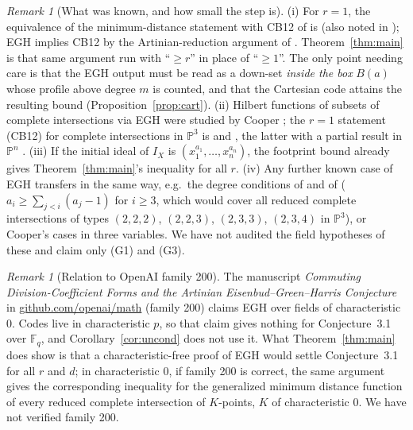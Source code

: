 \documentclass[11pt]{amsart}
\theoremstyle{remark}
\newtheorem{remark}[theorem]{Remark}
\theoremstyle{definition}
\newcommand{\F}{\mathbb F}
\begin{document}
\begin{remark}[What was known, and how small the step is]\label{rem:known}
(i) For $r=1$, the equivalence of the minimum-distance statement with CB12 of \cite{EGH96} is
\cite[Prop.~6.8]{CSTPV} (also noted in \cite[\S3]{CMSS}); EGH implies CB12 by the Artinian-reduction
argument of \cite{EGH96}. Theorem~\ref{thm:main} is that same argument run with ``$\ge r$'' in
place of ``$\ge1$''. The only point needing care is that the EGH output must be read as a down-set
\emph{inside the box} $B(a)$ whose profile above degree $m$ is counted, and that the Cartesian code attains
the resulting bound (Proposition~\ref{prop:cart}). (ii) Hilbert functions of subsets of complete
intersections via EGH were studied by Cooper \cite{Cooper12}; the $r=1$ statement (CB12) for complete
intersections in $\mathbb P^3$ is \cite[Cor.~4.4]{GK13} and \cite[Cor.~A]{CavigliaDeStefani}, the latter
with a partial result in $\mathbb P^n$ \cite[Thm.~B]{CavigliaDeStefani}. (iii) If the
initial ideal of $I_X$ is $(x_1^{a_1},\dots,x_n^{a_n})$, the footprint bound \cite[Thm.~4.9]{GSMBVV} already
gives Theorem~\ref{thm:main}'s inequality for all $r$. (iv) Any further known case of EGH transfers in the
same way, e.g.\ the degree conditions of \cite{CavigliaMaclagan} and of \cite[Thm.~A]{CDeS20}
($a_i\ge\sum_{j<i}(a_j-1)$ for $i\ge3$, which would cover all reduced complete intersections of types
$(2,2,2)$, $(2,2,3)$, $(2,3,3)$, $(2,3,4)$ in $\mathbb P^3$), or Cooper's cases in three variables. We have
not audited the field hypotheses of these and claim only (G1) and (G3).
\end{remark}

\begin{remark}[Relation to OpenAI family 200]
The manuscript \emph{Commuting Division-Coefficient Forms and the Artinian Eisenbud--Green--Harris
Conjecture} in \href{https://github.com/openai/math}{github.com/openai/math} (family 200) claims EGH over
fields of characteristic $0$. Codes live in characteristic $p$, so that claim gives nothing for
Conjecture~3.1 over $\F_q$, and Corollary~\ref{cor:uncond} does not use it. What Theorem~\ref{thm:main}
does show is that a characteristic-free proof of EGH would settle Conjecture~3.1 for all $r$ and $d$;
in characteristic $0$, if family 200 is correct, the same argument gives the corresponding inequality
for the generalized minimum distance function \cite{GSMBVV} of every reduced complete intersection of
$K$-points, $K$ of characteristic $0$. We have not verified family 200.
\end{remark}
\end{document}
